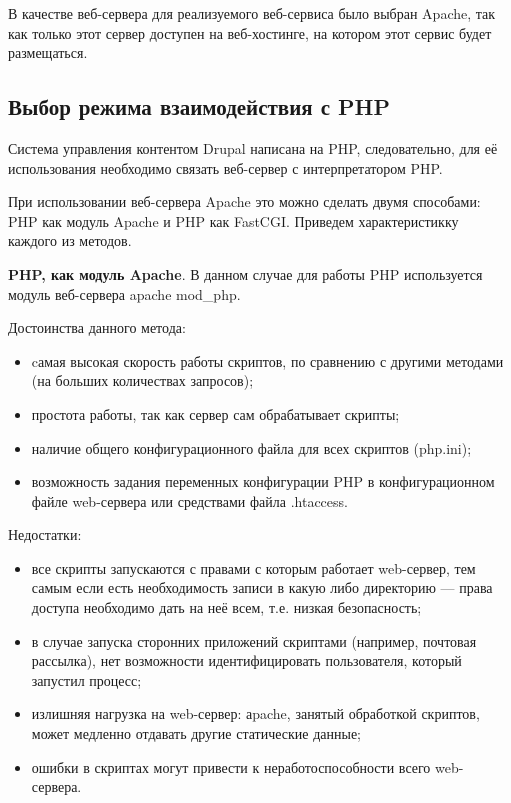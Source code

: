 В качестве веб-сервера для реализуемого веб-сервиса было выбран Apache, так как только этот сервер доступен
на веб-хостинге, на котором этот сервис будет размещаться.

\subsection{Выбор режима взаимодействия с PHP}
\label{ssec:choice_php_communication}

Система управления контентом Drupal написана на PHP, следовательно, для её использования необходимо связать
веб-сервер с интерпретатором PHP.

При использовании веб-сервера Apache это можно сделать двумя способами: PHP как модуль Apache и PHP как FastCGI.
Приведем характеристикку каждого из методов.

\textbf{PHP, как модуль Apache}. В данном случае для работы PHP используется модуль веб-сервера apache mod\_php.

Достоинства данного метода:
\begin{itemize}
\item
  cамая высокая скорость работы скриптов, по сравнению с другими методами (на больших количествах запросов);
\item
  простота работы, так как сервер сам обрабатывает скрипты;
\item
  наличие общего конфигурационного файла для всех скриптов (php.ini);
\item
  возможность задания переменных конфигурации PHP в конфигурационном файле web-сервера или средствами файла .htaccess.
\end{itemize}

Недостатки:
\begin{itemize}
\item все скрипты запускаются с правами с которым работает web-сервер, 
  тем самым если есть необходимость записи в какую либо директорию --- права доступа необходимо дать на неё всем,
  т.е. низкая безопасность;
\item
  в случае запуска сторонних приложений скриптами (например, почтовая рассылка), нет возможности идентифицировать пользователя,
  который запустил процесс;
\item
  излишняя нагрузка на web-сервер: аpache, занятый обработкой скриптов, может медленно отдавать другие статические данные;
\item
  ошибки в скриптах могут привести к неработоспособности всего web-сервера.
\end{itemize}


